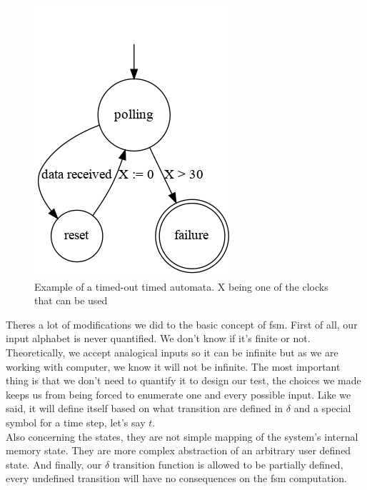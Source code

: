 \documentclass[12pt]{article}
\theoremstyle{definition}
\theoremstyle{definition}
\begin{document}
\begin{figure}
    \centering
    \includegraphics[scale=0.8]{timed_automata.png}
    \caption{Example of a timed-out timed automata. X being one of the clocks that can be used}
    \label{timed_automata_e1}
\end{figure}

Theres a lot of modifications we did to the basic concept of \gls{fsm}. First of all, our input alphabet is never quantified. We don't know if it's finite or not. Theoretically, we accept analogical inputs so it can be infinite but as we are working with computer, we know it will not be infinite. The most important thing is that we don't need to quantify it to design our test, the choices we made keeps us from being forced to enumerate one and every possible input. Like we said, it will define itself based on what transition are defined in $\delta$ and a special symbol for a time step, let's say $t$.\\

Also concerning the states, they are not simple mapping of the system's internal memory state. They are more complex abstraction of an arbitrary user defined state. And finally, our $\delta$ transition function is allowed to be partially defined, every undefined transition will have no consequences on the \gls{fsm} computation.


\end{document}

